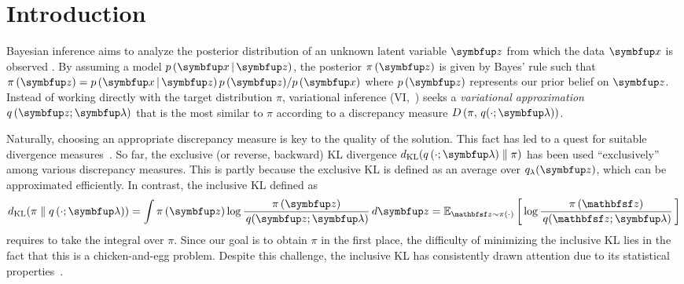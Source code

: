 
\section{Introduction}\label{section:intro}
Bayesian inference aims to analyze the posterior distribution of an unknown latent variable \(\vz\) from which the data \(\vx\) is observed .
By assuming a model \(p\,(\vx\,|\,\vz)\), the posterior \(\pi\,(\vz)\) is given by Bayes' rule such that \(\pi\,(\vz) = {p\,(\vx\,|\,\vz)\,p\,(\vz)}/{p\,(\vx)}\) where \(p\,(\vz)\) represents our prior belief on \(\vz\).
Instead of working directly with the target distribution \(\pi\), variational inference (VI,~\citealt{blei_variational_2017}) seeks a \textit{variational approximation} \(q\,(\vz; \vlambda)\) that is the most similar to \(\pi\) according to a discrepancy measure \(D\,(\pi,\, q(\cdot; \vlambda))\).

Naturally, choosing an appropriate discrepancy measure is key to the quality of the solution.
This fact has led to a quest for suitable divergence measures~\citep{pmlr-v37-salimans15, NIPS2016_7750ca35, NIPS2017_35464c84, NEURIPS2018_1cd138d0, pmlr-v97-ruiz19a}.
So far, the exclusive (or reverse, backward)  KL divergence \(\DKL{q\left(\cdot; \vlambda\right)}{\pi}\) has been used ``exclusively'' among various discrepancy measures.
This is partly because the exclusive KL is defined as an average over \(q_{\lambda}(\vz)\), which can be approximated efficiently.
In contrast, the inclusive KL defined as
%
{%
\vspace{-0.05in}
\begin{align*}
  \DKL{\pi}{q\left(\cdot; \vlambda\right)}
  = \int \pi\,(\vz) \log \frac{\pi\left(\vz\right)}{\,q(\vz; \vlambda)} \,d\vz
  = \Esub{\rvvz \sim \pi\left(\cdot\right)}{\log \frac{\pi\left(\rvvz\right)}{\,q(\rvvz; \vlambda)} } %
\end{align*}
}%
%
requires to take the integral over \(\pi\).
Since our goal is to obtain \(\pi\) in the first place, the difficulty of minimizing the inclusive KL lies in the fact that this is a chicken-and-egg problem.
Despite this challenge, the inclusive KL has consistently drawn attention due to its statistical properties~\citep{minka2005divergence, mackay_local_2001}.

